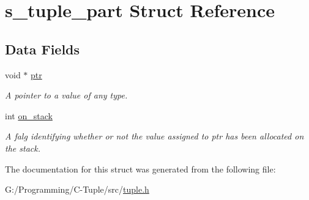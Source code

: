 \hypertarget{structs__tuple__part}{}\section{s\+\_\+tuple\+\_\+part Struct Reference}
\label{structs__tuple__part}
\subsection*{Data Fields}
\begin{DoxyCompactItemize}
\item 
void $\ast$ \hyperlink{structs__tuple__part_add9af9569af79ec26dd741fb226b38ba}{ptr}\hypertarget{structs__tuple__part_add9af9569af79ec26dd741fb226b38ba}{}\label{structs__tuple__part_add9af9569af79ec26dd741fb226b38ba}

\begin{DoxyCompactList}\small\item\em A pointer to a value of any type. \end{DoxyCompactList}\item 
int \hyperlink{structs__tuple__part_a5b5a4edd9167c9c2937631f949963954}{on\+\_\+stack}\hypertarget{structs__tuple__part_a5b5a4edd9167c9c2937631f949963954}{}\label{structs__tuple__part_a5b5a4edd9167c9c2937631f949963954}

\begin{DoxyCompactList}\small\item\em A falg identifying whether or not the value assigned to ptr has been allocated on the stack. \end{DoxyCompactList}\end{DoxyCompactItemize}


The documentation for this struct was generated from the following file\+:\begin{DoxyCompactItemize}
\item 
G\+:/\+Programming/\+C-\/\+Tuple/src/\hyperlink{tuple_8h}{tuple.\+h}\end{DoxyCompactItemize}
